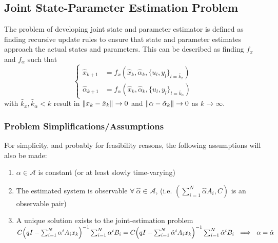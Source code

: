 \documentclass[]{article}
\begin{document}
\newpage
\subsection{Joint State-Parameter Estimation Problem}
The problem of developing joint state and parameter estimator is defined as finding recursive update rules to ensure that state and parameter estimates approach the actual states and parameters. This can be described as finding $f_x$ and $f_\alpha$ such that
\begin{equation}\label{eq:est_pblm_statement}
	\begin{cases}
		\hat{x}_{k+1} 		&= f_x(\hat{x}_k, \hat{\alpha}_k, \{u_l, y_l\}_{l=\bar{k}_x})\\
		\hat{\alpha}_{k+1} 	&= f_\alpha(\hat{x}_k, \hat{\alpha}_k, \{u_l, y_l\}_{l=\bar{k}_\alpha})
	\end{cases}
\end{equation}
with $\bar{k}_x, \bar{k}_\alpha < k$ result in $\norm{x_k - \hat{x}_k} \to 0$ and $\norm{\alpha - \hat{\alpha}_k} \to 0$ as $k \to \infty$.

\subsubsection{Problem Simplifications/Assumptions \cite{beelen2017joint}}
For simplicity, and probably for feasibility reasons, the following assumptions will also be made:

\begin{enumerate}
	\item $\alpha \in \mathcal{A}$ is constant (or at least slowly time-varying)
	\item The estimated system is observable $\forall \ \hat{\alpha} \in \mathcal{A}$, (i.e. $(\sum_{i=1}^N \hat{\alpha} A_i, C)$ is an observable pair)
	\item A unique solution exists to the joint-estimation problem\\
		$C \qty(q I - \sum_{i=1}^{N} \alpha^i A_i x_k)^{-1} \sum_{i=1}^N \alpha^i B_i = C \qty(q I - \sum_{i=1}^{N} \hat{\alpha}^i A_i x_k)^{-1} \sum_{i=1}^N \hat{\alpha}^i B_i \ \implies \ \alpha = \hat{\alpha}$
\end{enumerate}
\end{document}
